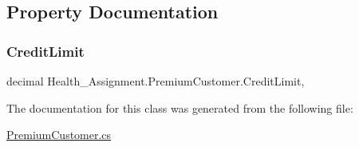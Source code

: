\subsection{Property Documentation}
\mbox{\label{class_health___assignment_1_1_premium_customer_afce0178dd2927338913c5499f5efdc3d}} 
\subsubsection{\texorpdfstring{Credit\+Limit}{CreditLimit}}
{\footnotesize\ttfamily decimal Health\+\_\+\+Assignment.\+Premium\+Customer.\+Credit\+Limit\hspace{0.3cm}{\ttfamily [get]}, {\ttfamily [set]}}



The documentation for this class was generated from the following file\+:\begin{DoxyCompactItemize}
\item 
\hyperlink{_premium_customer_8cs}{Premium\+Customer.\+cs}\end{DoxyCompactItemize}
